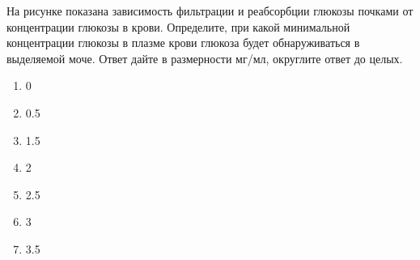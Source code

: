 
На рисунке показана зависимость фильтрации и
реабсорбции глюкозы почками от концентрации глюкозы в крови. Определите, при
какой минимальной концентрации глюкозы в плазме крови глюкоза будет
обнаруживаться в выделяемой моче. Ответ дайте в размерности мг/мл, округлите
ответ до целых.


\begin{enumerate}
    \item 0
    \item 0.5
    \item 1.5
    \item 2
    \item 2.5
    \item 3
    \item 3.5
\end{enumerate}

